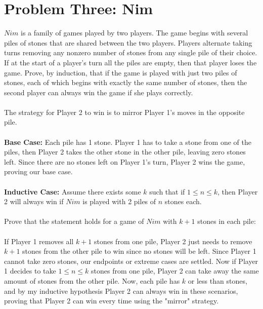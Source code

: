 \documentclass{article}
\begin{document}
\section*{Problem Three: Nim}
$Nim$ is a family of games played by two players. The game begins with several piles of stones
that are shared between the two players. Players alternate taking turns removing any nonzero
number of stones from any single pile of their choice. If at the start of a player's turn all the piles are empty, then that player loses the game. Prove, by induction, that if the game is played with just two piles of stones, each of which begins with exactly the same number of stones, then the second player can always win the game if she plays correctly.
\\
\\The strategy for Player 2 to win is to mirror Player 1's moves in the opposite pile. 
\\
\\\textbf{Base Case:} Each pile has 1 stone. Player 1 has to take a stone from one of the piles, then Player 2 takes the other stone in the other pile, leaving zero stones left. Since there are no stones left on Player 1's turn, Player 2 wins the game, proving our base case.
\\
\\\textbf{Inductive Case:} Assume there exists some $k$ such that if $1 \leqslant n \leqslant k$, then Player 2 will always win if $Nim$ is played with 2 piles of $n$ stones each.
\\
\\Prove that the statement holds for a game of $Nim$ with $k + 1$ stones in each pile:
\\
\\If Player 1 removes all $k + 1$ stones from one pile, Player 2 just needs to remove $k + 1$ stones from the other pile to win since no stones will be left. Since Player 1 cannot take zero stones, our endpoints or extreme cases are settled. Now if Player 1 decides to take $1 \leqslant n \leqslant k$ stones from one pile, Player 2 can take away the same amount of stones from the other pile. Now, each pile has $k$ or less than stones, and by my inductive hypothesis Player 2 can always win in these scenarios, proving that Player 2 can win every time using the "mirror" strategy.
\end{document}
